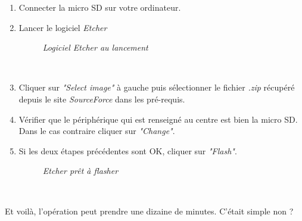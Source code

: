 \begin{enumerate}
	\item Connecter la micro SD sur votre ordinateur.\\
	\item Lancer le logiciel \textit{Etcher}\\
	\begin{figure}[H]
	\begin{center}
	\end{center}
		\caption{ \textit{Logiciel Etcher au lancement}}
	\end{figure}\\
	\item Cliquer sur \textit{"Select image"} à gauche puis sélectionner le fichier \textit{.zip} récupéré depuis le site \textit{SourceForce} dans les pré-requis.\\
	\item Vérifier que le périphérique qui est renseigné au centre est bien la micro SD. Dans le cas contraire cliquer sur \textit{"Change"}.\\
\newpage
	\item Si les deux étapes précédentes sont OK, cliquer sur \textit{"Flash"}.\\
	\begin{figure}[H]
	\begin{center}
	\end{center}
		\caption{ \textit{Etcher prêt à flasher}}
	\end{figure}\\
\end{enumerate}
Et voilà, l'opération peut prendre une dizaine de minutes. C'était simple non ?

